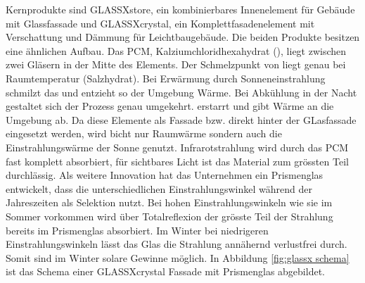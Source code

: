 \documentclass[11pt,a4paper]{scrartcl}
\begin{document}
{Kernprodukte sind
GLASSX\circledR store, ein kombinierbares Innenelement für Gebäude mit
Glassfassade und GLASSX\circledR crystal, ein Komplettfasadenelement mit
Verschattung und Dämmung für Leichtbaugebäude. Die beiden Produkte besitzen eine
ähnlichen Aufbau. Das PCM, Kalziumchloridhexahydrat (),
liegt zwischen zwei Gläsern in der Mitte des Elements. Der Schmelzpunkt von
 liegt genau bei Raumtemperatur (Salzhydrat). Bei
Erwärmung durch Sonneneinstrahlung schmilzt das  und
entzieht so der Umgebung Wärme. Bei Abkühlung in der Nacht gestaltet sich der
Prozess genau umgekehrt.  erstarrt und gibt Wärme an die
Umgebung ab. Da diese Elemente als Fassade bzw. direkt hinter der GLasfassade
eingesetzt werden, wird bicht nur Raumwärme sondern auch die Einstrahlungswärme
der Sonne genutzt. Infrarotstrahlung wird durch das PCM fast komplett
absorbiert, für sichtbares Licht ist das Material zum grössten Teil durchlässig.
Als weitere Innovation hat das Unternehmen ein Prismenglas entwickelt, dass die
unterschiedlichen Einstrahlungswinkel während der Jahreszeiten als Selektion
nutzt. Bei hohen Einstrahlungswinkeln wie sie im Sommer vorkommen wird über
Totalreflexion der grösste Teil der Strahlung bereits im Prismenglas absorbiert.
Im Winter bei niedrigeren Einstrahlungswinkeln lässt das Glas die Strahlung
annähernd verlustfrei durch. Somit sind im Winter solare Gewinne möglich. In
Abbildung \ref{fig:glassx schema} ist das Schema einer GLASSX\circledR crystal
Fassade mit Prismenglas abgebildet. 

}
\end{document}

